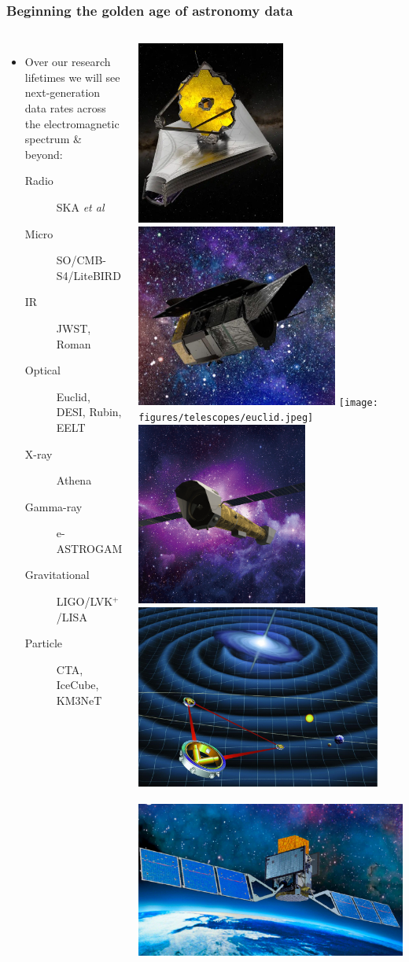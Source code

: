 \documentclass[aspectratio=169]{beamer}
\begin{document}
\begin{frame}
    \frametitle{Beginning the golden age of astronomy data}
    \begin{columns}
        \begin{itemize}
            \item Over our research lifetimes we will see next-generation data rates across the electromagnetic spectrum \& beyond:
                \begin{description}
                    \item[Radio] SKA \textit{et al}
                    \item[Micro] SO/CMB-S4/LiteBIRD
                    \item[IR] JWST, Roman
                    \item[Optical] Euclid, DESI, Rubin, EELT
                    \item[X-ray] Athena
                    \item[Gamma-ray] e-ASTROGAM
                    \item[Gravitational] LIGO/LVK$^+$/LISA
                    \item[Particle] CTA, IceCube, KM3NeT
                \end{description}
        \end{itemize}

        \includegraphics[height=0.145\textwidth]{figures/telescopes/jwst.png}%
        \includegraphics[height=0.145\textwidth]{figures/telescopes/roman.jpg}%
        \texttt{[image: figures/telescopes/euclid.jpeg]}%
        \includegraphics[height=0.145\textwidth]{figures/telescopes/athena.jpg}%
        \includegraphics[height=0.145\textwidth]{figures/telescopes/lisa.jpg}%
        \includegraphics[height=0.145\textwidth]{figures/telescopes/e-ASTROGAM.pdf}%
        \vspace{-1pt}


\end{columns}
\end{frame}
\end{document}
